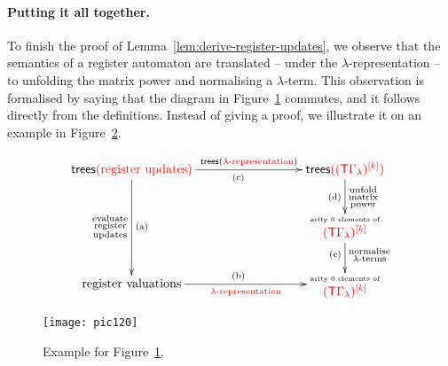 \label{page:monotone-discussed}


\paragraph*{Putting it all together.} To finish the proof of Lemma~\ref{lem:derive-register-updates}, we   observe  that the semantics of a register automaton are translated -- under the $\lambda$-representation -- to unfolding the matrix power and normalising a $\lambda$-term.  This observation is formalised by saying that the diagram in Figure~\ref{fig:lambda-representation-diagram} commutes, and it  follows directly from the definitions. Instead of giving a proof, we illustrate it on an example in Figure~\ref{fig:lambda-representation-proof}.



\begin{figure}[]
    \centering
    \begin{align*}
        \xymatrix@C=3cm{
            \trees \ranked{\text{(register updates)}} 
            \ar[dd]_{\substack{\text{evaluate}\\\text{register}\\\text{updates}}}^{\text{(a)}}
            \ar[r]^-{\trees(\text{\ranked{$\lambda$-representation}})}_{\text{(c)}}
            &
            \trees \ranked{(\mati k{(\tmonad \Gamma_\lambda)})}
            \ar[d]^{\substack{\text{unfold}\\\text{matrix}\\\text{power}}}_{\text{(d)}} \\
            & 
            \txt{{\tiny arity 0 elements of }\\
            $
            \mati k {\ranked{(\tmonad \Gamma_\lambda)}}
            $}
            \ar[d]^{\substack{\text{normalise}\\\text{$\lambda$-terms}}}_{\text{(e)}}\\
             \text{register valuations}
            \ar[r]_-{\ranked{\text{$\lambda$-representation}}}^{\text{(b)}}
            &
            \txt{{\tiny arity 0 elements of }\\
            $
            \mati k {\ranked{(\tmonad \Gamma_\lambda)}}
            $}
        }
    \end{align*} 
    \caption{}
    \label{fig:lambda-representation-diagram}
\end{figure}
\begin{figure}[]   
    \hspace{-0.5cm}
    \texttt{[image: pic120]}
    \caption{Example for Figure~\ref{fig:lambda-representation-diagram}.}
    \label{fig:lambda-representation-proof}
\end{figure}
 
